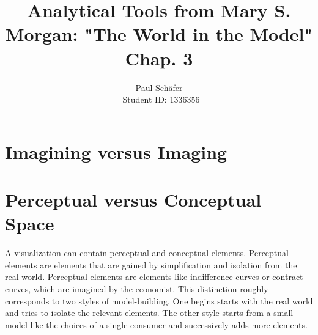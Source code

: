 \documentclass[12pt,a4paper, margin = 2.5cm]{article}
\author{Paul Sch\"afer \\\ Student ID: 1336356}
\begin{document}
\title{Analytical Tools from Mary S. Morgan: "The World in the Model" Chap. 3}
\maketitle
\section*{Imagining versus Imaging}

\section*{Perceptual versus Conceptual Space}
A visualization can contain perceptual and conceptual elements. Perceptual elements are elements that are gained by simplification and isolation from the real world. Perceptual elements are elements like indifference curves or contract curves, which are imagined by the economist. This distinction roughly corresponds to two styles of model-building. One begins starts with the real world and tries to isolate the relevant elements. The other style starts from a small model like the choices of a single consumer and successively adds more elements.  
\pagebreak

\end{document}
